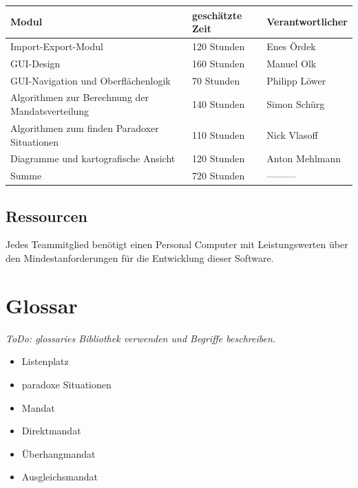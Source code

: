 \documentclass[10pt,a4paper]{article}
\begin{document}
\begin{tabular}[h]{lll}
	\hline
	\textbf{Modul} & \textbf{geschätzte Zeit} & \textbf{Verantwortlicher} \\
	\hline
	Import-Export-Modul & 120 Stunden & Enes Ördek\\
	GUI-Design & 160 Stunden & Manuel Olk \\
	GUI-Navigation und Oberflächenlogik & 70 Stunden &  Philipp Löwer\\
	Algorithmen zur Berechnung der Mandatsverteilung & 140 Stunden &  Simon Schürg\\
	Algorithmen zum finden Paradoxer Situationen  & 110 Stunden &  Nick Vlasoff\\
	Diagramme und kartografische Ansicht  & 120 Stunden &  Anton Mehlmann\\
	\hline
	Summe & 720 Stunden & --------- \\
	\hline
\end{tabular}

\subsection{Ressourcen}
Jedes Teammitglied benötigt einen Personal Computer mit Leistungswerten über den Mindestanforderungen für die Entwicklung dieser Software.

\section{Glossar}
\textit{ToDo: glossaries Bibliothek verwenden und Begriffe beschreiben.}
\begin{itemize}
	\item Listenplatz
	\item paradoxe Situationen
	\item Mandat	
	\item Direktmandat	
	\item Überhangmandat
	\item Ausgleichsmandat
\end{itemize}
\end{document}
